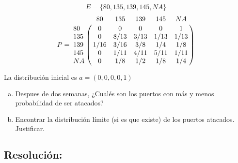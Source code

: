 \documentclass{article}
\begin{document}
$$ E = \{ 80,135,139,145,NA \} $$
$$
P = 
\bordermatrix{ 
\text{} & 80 & 135 & 139 & 145 & NA \cr
80&0&0&0&0&1 \cr
135&0&8/13&3/13&1/13&1/13 \cr
139&1/16&3/16&3/8&1/4&1/8 \cr
145&0&1/11&4/11&5/11&1/11 \cr
NA&0&1/8&1/2&1/8&1/4 
}
$$

La distribución inicial es $a = (0,0,0,0,1)$


\begin{enumerate}[(a)] 

\item Despues de dos semanas, ¿Cualés son los puertos con más y menos probabilidad de ser atacados?
\item Encontrar la distribución límite (si es que existe) de los puertos atacados. Justificar.
\end{enumerate}

\subsection*{Resolución:}
\end{document}
